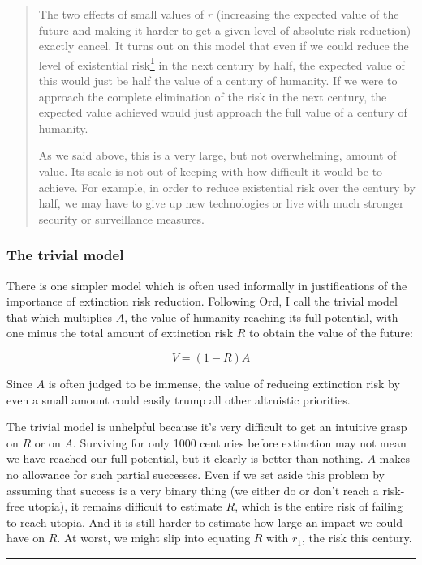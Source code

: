 \documentclass[british]{article}
\begin{document}
\begin{quote}
The two effects of small values of \(r\) (increasing the expected value
of the future and making it harder to get a given level of absolute risk
reduction) exactly cancel. It turns out on this model that even if we
could reduce the level of existential risk\footnote{Ord uses existential risk, but for reasons I discuss above, I prefer to talk only of extinction risk.} in the next century by half, the expected value of this would just be half the value of a century of
humanity. If we were to approach the complete elimination of the risk in
the next century, the expected value achieved would just approach the
full value of a century of humanity.

As we said above, this is a very large, but not overwhelming, amount of
value. Its scale is not out of keeping with how difficult it would be to
achieve. For example, in order to reduce existential risk over the
century by half, we may have to give up new technologies or live with
much stronger security or surveillance measures.
\end{quote}

\subsubsection{The trivial model}\label{header-n93}
There is one simpler model which is often used informally in justifications of the importance of extinction risk reduction. Following Ord, I call the trivial model that which multiplies \(A\), the value of humanity reaching its full potential, with one minus the total amount of extinction risk \(R\) to obtain the value of the future:

\[V=(1-R)A\]

Since \(A\) is often judged to be immense, the value of reducing extinction risk by even a small amount could easily trump all other altruistic priorities.

The trivial model is unhelpful because it's very difficult to get an intuitive grasp on $R$ or on $A$. Surviving for only 1000 centuries before extinction may not mean we have reached our full potential, but it clearly is better than nothing. $A$ makes no allowance for such partial successes. Even if we set aside this problem by assuming that success is a very binary thing (we either do or don't reach a risk-free utopia), it remains difficult to estimate $R$, which is the entire risk of failing to reach utopia. And it is still harder to estimate how large an impact we could have on $R$. At worst, we might slip into equating $R$ with $r_1$, the risk this century.
\end{document}
